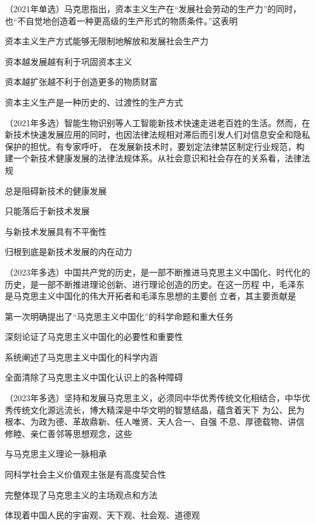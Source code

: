 \documentclass[lang=cn,newtx,10pt,scheme=chinese,pad,twocol]{zznote}
\begin{document}
\begin{example} （2021年单选）马克思指出，资本主义生产在“发展社会劳动的生产力”的同时，也“不自觉地创造着一种更高级的生产形式的物质条件。”这表明
	\begin{choice}
		\item 资本主义生产方式能够无限制地解放和发展社会生产力
		\item 资本越发展越有利于巩固资本主义
		\item 资本越扩张越不利于创造更多的物质财富
		\item 资本主义生产是一种历史的、过渡性的生产方式
	\end{choice}
\end{example}




\begin{example}
	（2021年多选）智能生物识别等人工智能新技术快速走进老百姓的生活。然而，在新技术快速发展应用的同时，也因法律法规相对滞后而引发人们对信息安全和隐私保护的担忧。有专家呼吁， 在发展新技术时，要划定法律禁区制定行业规范，构建一个新技术健康发展的法律法规体系。从社会意识和社会存在的关系看，法律法规
	\begin{choice}
		\item 总是阻碍新技术的健康发展
		\item 只能落后于新技术发展
		\item 与新技术发展具有不平衡性
		\item 归根到底是新技术发展的内在动力
	\end{choice}
\end{example}

\begin{example}	（2023年多选）中国共产党的历史，是一部不断推进马克思主义中国化、时代化的 历史，是一部不断推进理论创新、进行理论创造的历史。在这一历程  中，毛泽东是马克思主义中国化的伟大开拓者和毛泽东思想的主要创
	立者，其主要贡献是
	\begin{choice}
		\item 第一次明确提出了“马克思主义中国化”的科学命题和重大任务
		\item 深刻论证了马克思主义中国化的必要性和重要性
		\item 系统阐述了马克思主义中国化的科学内涵
		\item 全面清除了马克思主义中国化认识上的各种障碍
	\end{choice}
\end{example}

\begin{example} （2023年多选）坚持和发展马克思主义，必须同中华优秀传统文化相结合，中华优 秀传统文化源远流长，博大精深是中华文明的智慧结晶，蕴含着天下  为公、民为根本、为政为德、革故鼎新、任人唯贤、天人合一、自强
	不息、厚德载物、讲信修睦、亲仁善邻等思想观念，这些
	\begin{choice}
		\item  与马克思主义理论一脉相承
		\item 同科学社会主义价值观主张是有高度契合性
		\item 完整体现了马克思主义的主场观点和方法
		\item 体现着中国人民的宇宙观、天下观、社会观、道德观
	\end{choice}
\end{example}
\end{document}
